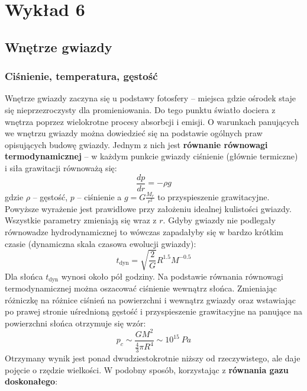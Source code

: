 \documentclass[../index.tex]{subfiles}
\begin{document}
    \section{Wykład 6} 
        \subsection{Wnętrze gwiazdy}
            \subsubsection{Ciśnienie, temperatura, gęstość}
                Wnętrze gwiazdy zaczyna się u podstawy fotosfery \--- miejsca gdzie ośrodek staje się nieprzezroczysty dla promieniowania. Do tego punktu światło dociera z wnętrza poprzez wielokrotne procesy absorbcji i emisji. O warunkach panujących we wnętrzu gwiazdy można dowiedzieć się na podstawie ogólnych praw opisujących budowę gwiazdy. Jednym z nich jest \textbf{równanie równowagi termodynamicznej} \--- w każdym punkcie gwiazdy ciśnienie (głównie termiczne) i siła grawitacji równoważą się:
                \begin{equation}
                    \frac{dp}{dr} = -\rho g
                \end{equation}
                gdzie \(\rho\) \--- gęstość, \(p\) \--- ciśnienie a \(g = G \frac{M_r}{r^2 } \) to przyspieszenie grawitacyjne. Powyższe wyrażenie jest prawidłowe przy założeniu idealnej kulistości gwiazdy. Wszystkie parametry zmieniają się wraz z \(r\). Gdyby gwiazdy nie podlegały równowadze hydrodynamicznej to wówczas zapadałyby się w bardzo krótkim czasie (dynamiczna skala czasowa ewolucji gwiazdy):
                \begin{equation}
                    t_\text{dyn} = \sqrt{\frac{2}{G}} R^{1.5}M^{-0.5} 
                \end{equation}
                Dla słońca \(t_\text{dyn}\) wynosi około pół godziny. Na podstawie równania równowagi termodynamicznej można oszacować ciśnienie wewnątrz słońca. Zmieniając różniczkę na różnice ciśnień na powierzchni i wewnątrz gwiazdy oraz wstawiając po prawej stronie uśrednioną gęstość i przyspieszenie grawitacyjne na panujące na powierzchni słońca otrzymuje się wzór:
                \begin{equation}
                    p_c \sim \frac{GM^2 }{\frac{4}{3}\pi R^{4}} \sim 10^{15}\: Pa \label{eq:star_pressure}
                \end{equation}
                Otrzymany wynik jest ponad dwudziestokrotnie niższy od rzeczywistego, ale daje pojęcie o rzędzie wielkości. W podobny sposób, korzystając z \textbf{równania gazu doskonałego}:
\end{document}
